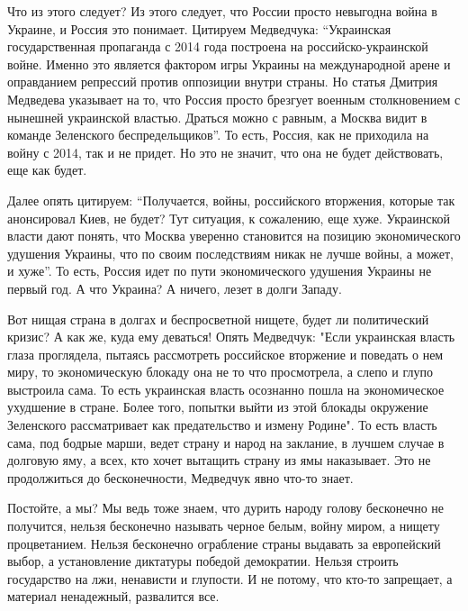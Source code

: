 Что из этого следует? Из этого следует, что России просто невыгодна война в
Украине, и Россия это понимает. Цитируем Медведчука: \enquote{Украинская
государственная пропаганда с 2014 года построена на российско-украинской войне.
Именно это является фактором игры Украины на международной арене и оправданием
репрессий против оппозиции внутри страны. Но статья Дмитрия Медведева указывает
на то, что Россия просто брезгует военным столкновением с нынешней украинской
властью. Драться можно с равным, а Москва видит в команде Зеленского
беспредельщиков}. То есть, Россия, как не приходила на войну с 2014, так и не
придет. Но это не значит, что она не будет действовать, еще как будет. 

Далее опять цитируем: \enquote{Получается, войны, российского вторжения, которые так
анонсировал Киев, не будет? Тут ситуация, к сожалению, еще хуже. Украинской
власти дают понять, что Москва уверенно становится на позицию экономического
удушения Украины, что по своим последствиям никак не лучше войны, а может, и
хуже}. То есть, Россия идет по пути экономического удушения Украины не первый
год. А что Украина? А ничего, лезет в долги Западу. 

Вот нищая страна в долгах и беспросветной нищете, будет ли политический кризис?
А как же, куда ему деваться! Опять Медведчук: "Если украинская власть глаза
проглядела, пытаясь рассмотреть российское вторжение и поведать о нем миру, то
экономическую блокаду она не то что просмотрела, а слепо и глупо выстроила
сама. То есть украинская власть осознанно пошла на экономическое ухудшение в
стране. Более того, попытки выйти из этой блокады окружение Зеленского
рассматривает как предательство и измену Родине". То есть власть сама, под
бодрые марши, ведет страну и народ на заклание, в лучшем случае в долговую яму,
а всех, кто хочет вытащить страну из ямы наказывает. Это не продолжиться до
бесконечности, Медведчук явно что-то знает. 

Постойте, а мы? Мы ведь тоже знаем, что дурить народу голову бесконечно не
получится, нельзя бесконечно называть черное белым, войну миром, а нищету
процветанием. Нельзя бесконечно ограбление страны выдавать за европейский
выбор, а установление диктатуры победой демократии. Нельзя строить государство
на лжи, ненависти и глупости. И не потому, что кто-то запрещает, а материал
ненадежный, развалится все.

